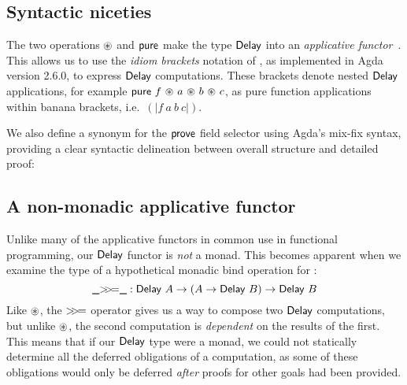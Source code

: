 \documentclass[sigplan,review]{acmart}\settopmatter{printfolios=true,printccs=false,printacmref=false}
\begin{document}
\subsection{Syntactic niceties}
The two operations $\circledast$ and $\AgdaFunction{pure}$ 
make the type $\AgdaDatatype{Delay}$ into an \emph{applicative functor}~\citep{applicatives}.
This allows us to use the \emph{idiom brackets} notation of \citet{applicatives}, as implemented in Agda 
version 2.6.0, to express $\AgdaDatatype{Delay}$ computations. These brackets denote nested $\AgdaDatatype{Delay}$ applications, for example $\AgdaFunction{pure}\ f\ \AgdaFunction{\ensuremath\circledast}\ a\ \AgdaFunction{\ensuremath\circledast}\ b\ \AgdaFunction{\ensuremath\circledast}\ c$, 
as pure function applications within banana brackets, i.e.\ $(\!\vert f\ a\ b\ c \vert\!)$.

We also define a synonym for the $\AgdaField{prove}$ field selector using Agda's mix-fix syntax, 
providing a clear syntactic delineation between overall structure and detailed proof:
\begin{code}
\>[2]\AgdaSpace{}%
\AgdaSymbol{=}\AgdaSpace{}%
\<%
\end{code}
\subsection{A non-monadic applicative functor}
Unlike many of the applicative functors in common use in functional programming, 
our $\AgdaDatatype{Delay}$ functor is \emph{not} a monad. This becomes apparent 
when we examine the type of a hypothetical monadic bind operation for :
$$
\AgdaFunction{\AgdaUnderscore{}\ensuremath{>\!\!>\!=}\AgdaUnderscore{}} : \AgdaDatatype{Delay}\ A \rightarrow (A \rightarrow \AgdaDatatype{Delay}\ B) \rightarrow \AgdaDatatype{Delay}\ B
$$
Like $\AgdaFunction{\ensuremath{\circledast}}$, the $\AgdaFunction{\ensuremath{>\!\!>\!=}}$ operator gives us a way to compose 
two $\AgdaDatatype{Delay}$ computations, but 
unlike $\AgdaFunction{\ensuremath{\circledast}}$, the second computation is
 \emph{dependent} on the results of the first. 
 This means that if our $\AgdaDatatype{Delay}$ type were a monad, we could not
 statically determine all the deferred obligations of a computation, 
 as some of these obligations would only be deferred \emph{after} proofs for other 
 goals had been provided. 
\end{document}
